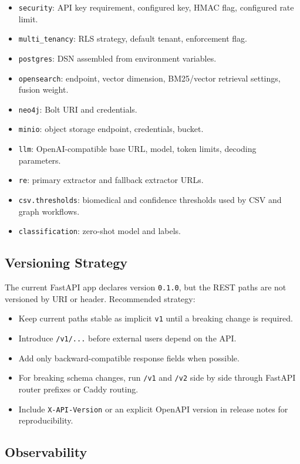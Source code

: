 \documentclass[10pt,letterpaper]{article}
\begin{document}
\begin{itemize}
\item \texttt{security}: API key requirement, configured key, HMAC flag, configured rate limit.
\item \texttt{multi\_tenancy}: RLS strategy, default tenant, enforcement flag.
\item \texttt{postgres}: DSN assembled from environment variables.
\item \texttt{opensearch}: endpoint, vector dimension, BM25/vector retrieval settings, fusion weight.
\item \texttt{neo4j}: Bolt URI and credentials.
\item \texttt{minio}: object storage endpoint, credentials, bucket.
\item \texttt{llm}: OpenAI-compatible base URL, model, token limits, decoding parameters.
\item \texttt{re}: primary extractor and fallback extractor URLs.
\item \texttt{csv.thresholds}: biomedical and confidence thresholds used by CSV and graph workflows.
\item \texttt{classification}: zero-shot model and labels.
\end{itemize}

\subsection{Versioning Strategy}

The current FastAPI app declares version \texttt{0.1.0}, but the REST paths are not versioned by URI or header. Recommended strategy:

\begin{itemize}
\item Keep current paths stable as implicit \texttt{v1} until a breaking change is required.
\item Introduce \texttt{/v1/...} before external users depend on the API.
\item Add only backward-compatible response fields when possible.
\item For breaking schema changes, run \texttt{/v1} and \texttt{/v2} side by side through FastAPI router prefixes or Caddy routing.
\item Include \texttt{X-API-Version} or an explicit OpenAPI version in release notes for reproducibility.
\end{itemize}

\subsection{Observability}
\end{document}
